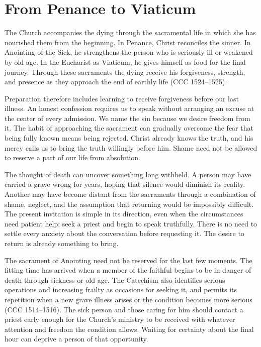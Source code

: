 \section{From Penance to Viaticum}

The Church accompanies the dying through the sacramental life in which she has nourished them from the beginning. In Penance, Christ reconciles the sinner. In Anointing of the Sick, he strengthens the person who is seriously ill or weakened by old age. In the Eucharist as Viaticum, he gives himself as food for the final journey. Through these sacraments the dying receive his forgiveness, strength, and presence as they approach the end of earthly life (CCC 1524--1525).

Preparation therefore includes learning to receive forgiveness before our last illness. An honest confession requires us to speak without arranging an excuse at the center of every admission. We name the sin because we desire freedom from it. The habit of approaching the sacrament can gradually overcome the fear that being fully known means being rejected. Christ already knows the truth, and his mercy calls us to bring the truth willingly before him. Shame need not be allowed to reserve a part of our life from absolution.

The thought of death can uncover something long withheld. A person may have carried a grave wrong for years, hoping that silence would diminish its reality. Another may have become distant from the sacraments through a combination of shame, neglect, and the assumption that returning would be impossibly difficult. The present invitation is simple in its direction, even when the circumstances need patient help: seek a priest and begin to speak truthfully. There is no need to settle every anxiety about the conversation before requesting it. The desire to return is already something to bring.

The sacrament of Anointing need not be reserved for the last few moments. The fitting time has arrived when a member of the faithful begins to be in danger of death through sickness or old age. The Catechism also identifies serious operations and increasing frailty as occasions for seeking it, and permits its repetition when a new grave illness arises or the condition becomes more serious (CCC 1514--1516). The sick person and those caring for him should contact a priest early enough for the Church's ministry to be received with whatever attention and freedom the condition allows. Waiting for certainty about the final hour can deprive a person of that opportunity.

